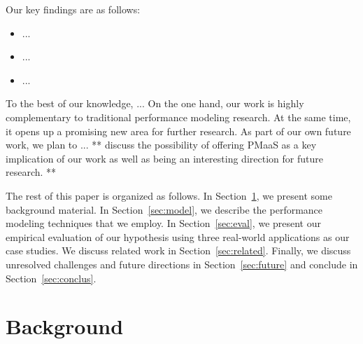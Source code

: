 \documentclass{acm_proc_article-sp}
\begin{document}
Our key findings are as follows:
\begin{itemize}
\item ...
\item ...
\item ...
\end{itemize}


To the best of our knowledge, ... On the one hand, our work is highly complementary to traditional performance modeling research. At the same time, it opens up a promising new area for further research. As part of our own future work, we plan to ... ** discuss the possibility of offering PMaaS as a key implication of our work as well as being an interesting direction for future research. **

The rest of this paper is organized as follows. In Section~\ref{sec:back}, we present some background material.  In Section~\ref{sec:model}, we describe the performance modeling techniques that we employ.  In Section~\ref{sec:eval}, we present our empirical evaluation of our hypothesis using three real-world applications as our case studies. We discuss related work in Section~\ref{sec:related}.  Finally, we discuss unresolved challenges and future directions in Section~\ref{sec:future} and conclude in Section~\ref{sec:conclus}. 



 


\section{Background}
\label{sec:back}
\vspace{10pt}

 
\end{document}
